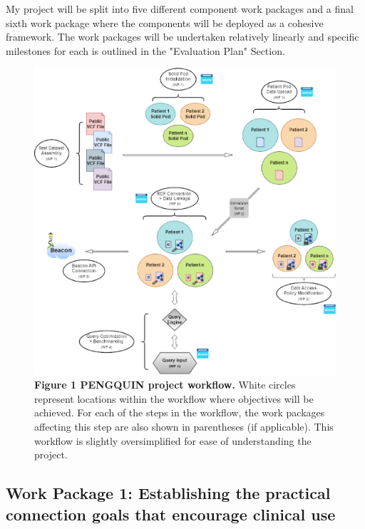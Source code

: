 \documentclass[runningheads]{llncs}
\begin{document}
My project will be split into five different component work packages and a final sixth work package where the components will be deployed as a cohesive framework. 
The work packages will be undertaken relatively linearly and specific milestones for each is outlined in the "Evaluation Plan" Section.

\begin{figure}
\includegraphics[width=\textwidth]{fig1.eps}
\caption{\textbf{Figure 1 PENGQUIN project workflow.}
White circles represent locations within the workflow where objectives will be achieved. 
For each of the steps in the workflow, the work packages affecting this step are also shown in parentheses (if applicable). 
This workflow is slightly oversimplified for ease of understanding the project.
} \label{fig1}
\end{figure}

\subsection{Work Package 1: Establishing the practical connection goals that encourage clinical use}
\end{document}
